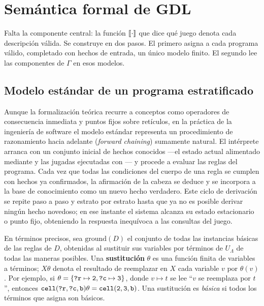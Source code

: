 \section{Semántica formal de GDL}
\label{sec:an_semantica}

Falta la componente central: la función $[\![\cdot]\!]$ que dice qué juego denota cada descripción válida. Se construye en dos pasos. El primero asigna a cada programa válido, completado con hechos de entrada, un único modelo finito. El segundo lee las componentes de $\Gamma$ en esos modelos.

\subsection{Modelo estándar de un programa estratificado}

Aunque la formalización teórica recurre a conceptos como operadores de consecuencia inmediata y puntos fijos sobre retículos, en la práctica de la ingeniería de software el modelo estándar representa un procedimiento de razonamiento hacia adelante (\emph{forward chaining}) sumamente natural. El intérprete arranca con un conjunto inicial de hechos conocidos —el estado actual alimentado mediante  y las jugadas ejecutadas con — y procede a evaluar las reglas del programa. Cada vez que todas las condiciones del cuerpo de una regla se cumplen con hechos ya confirmados, la afirmación de la cabeza se deduce y se incorpora a la base de conocimiento como un nuevo hecho verdadero. Este ciclo de derivación se repite paso a paso y estrato por estrato hasta que ya no es posible derivar ningún hecho novedoso; en ese instante el sistema alcanza su estado estacionario o punto fijo, obteniendo la respuesta inequívoca a las consultas del juego.

En términos precisos, sea $\mathrm{ground}(D)$ el conjunto de todas las instancias básicas de las reglas de $D$, obtenidas al sustituir sus variables por términos de $U_\Lambda$ de todas las maneras posibles. Una \textbf{sustitución} $\theta$ es una función finita de variables a términos; $X\theta$ denota el resultado de reemplazar en $X$ cada variable $v$ por $\theta(v)$. Por ejemplo, si $\theta = \{\texttt{?r} \mapsto \texttt{2}, \texttt{?c} \mapsto \texttt{3}\}$, donde $v \mapsto t$ se lee ``$v$ se reemplaza por $t$'', entonces $\texttt{cell}(\texttt{?r}, \texttt{?c}, \texttt{b})\theta = \texttt{cell}(\texttt{2}, \texttt{3}, \texttt{b})$. Una sustitución es \emph{básica} si todos los términos que asigna son básicos.


